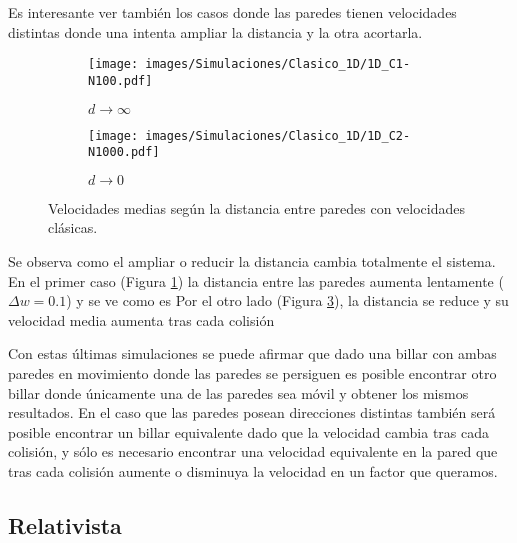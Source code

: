 \vspace{3mm}

Es interesante ver también los casos donde las paredes tienen velocidades distintas donde una intenta ampliar la distancia y la otra acortarla. 

\begin{figure}[H]
    \begin{subfigure}[b]{0.5\textwidth}
        \centering
        \texttt{[image: images/Simulaciones/Clasico\_1D/1D\_C1-N100.pdf]}
        \caption{$d \rightarrow \infty$}
        \label{fig:clasico_distancia_infinito}
    \end{subfigure}
    \hfill
    \begin{subfigure}[b]{0.5\textwidth}
        \centering
        \texttt{[image: images/Simulaciones/Clasico\_1D/1D\_C2-N1000.pdf]}
        \caption{$d \rightarrow 0$}
        \label{fig:clasico_distancia_cero}
    \end{subfigure}
    \caption{Velocidades medias según la distancia entre paredes con velocidades clásicas.}
\end{figure}

Se observa como el ampliar o reducir la distancia cambia totalmente el sistema. En el primer caso (Figura \ref{fig:clasico_distancia_infinito}) la distancia entre las paredes aumenta lentamente (\( \Delta w = 0.1 \)) y se ve como es  Por el otro lado (Figura \ref{fig:clasico_distancia_cero}), la distancia se reduce y su velocidad media aumenta tras cada colisión 

\vspace{3mm}

Con estas últimas simulaciones se puede afirmar que dado una billar con ambas paredes en movimiento donde las paredes se persiguen es posible encontrar otro billar donde únicamente una de las paredes sea móvil y obtener los mismos resultados. En el caso que las paredes posean direcciones distintas también será posible encontrar un billar equivalente dado que la velocidad cambia tras cada colisión, y sólo es necesario encontrar una velocidad equivalente en la pared que tras cada colisión aumente o disminuya la velocidad en un factor que queramos. 

\subsection{Relativista}

